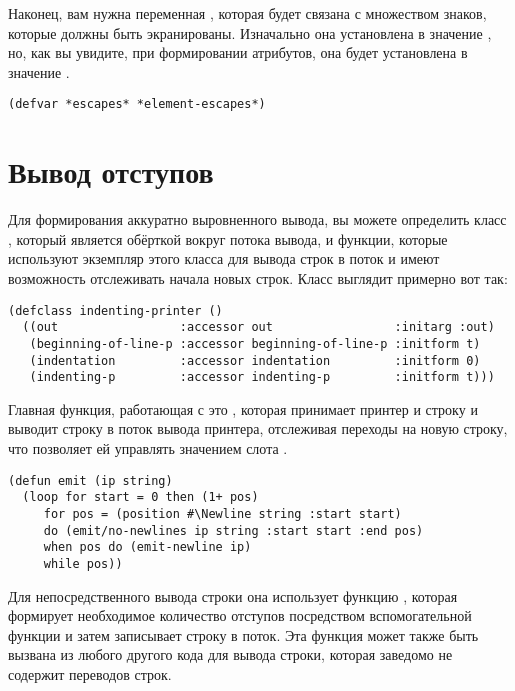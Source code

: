 Наконец, вам нужна переменная , которая будет связана с множеством знаков,
которые должны быть экранированы. Изначально она установлена в значение
, но, как вы увидите, при формировании атрибутов, она будет
установлена в значение .

\begin{lstlisting}
(defvar *escapes* *element-escapes*)
\end{lstlisting}

\section{Вывод отступов}

Для формирования аккуратно выровненного вывода, вы можете определить класс
, который является обёрткой вокруг потока вывода, и функции,
которые используют экземпляр этого класса для вывода строк в поток и имеют возможность
отслеживать начала новых строк. Класс выглядит примерно вот так:

\begin{lstlisting}
(defclass indenting-printer ()
  ((out                 :accessor out                 :initarg :out)
   (beginning-of-line-p :accessor beginning-of-line-p :initform t)
   (indentation         :accessor indentation         :initform 0)
   (indenting-p         :accessor indenting-p         :initform t)))
\end{lstlisting}

Главная функция, работающая с  это , которая принимает
принтер и строку и выводит строку в поток вывода принтера, отслеживая переходы на новую
строку, что позволяет ей управлять значением слота .

\begin{lstlisting}
(defun emit (ip string)
  (loop for start = 0 then (1+ pos)
     for pos = (position #\Newline string :start start)
     do (emit/no-newlines ip string :start start :end pos)
     when pos do (emit-newline ip)
     while pos))
\end{lstlisting}

Для непосредственного вывода строки она использует функцию ,
которая формирует необходимое количество отступов посредством вспомогательной функции
 и затем записывает строку в поток.  Эта функция может также
быть вызвана из любого другого кода для вывода строки, которая заведомо не содержит
переводов строк.

